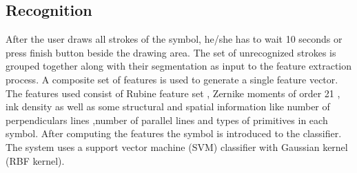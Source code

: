 \documentclass[a4paper,10pt]{IEEEconf}
\begin{document}
\subsection{Recognition}
After the user draws all strokes of the symbol, he/she has to wait 10 seconds or press finish button beside the drawing area. The set of unrecognized strokes is grouped together along with their segmentation as input to the feature extraction process. A composite set of features is used to generate a single feature vector. The features used consist of Rubine feature set \cite{gestureexample12},  Zernike moments of order 21 \cite{HeloiseBeautification}, ink density \cite{GeometryAndDomain102} as well as some structural and spatial information like number of perpendiculars lines ,number of parallel lines and types of primitives in each symbol. After computing the features the symbol is introduced to the classifier. The system uses a support vector machine (SVM) classifier with Gaussian kernel (RBF kernel)\cite{libsvm}.\\%
%
\end{document}
